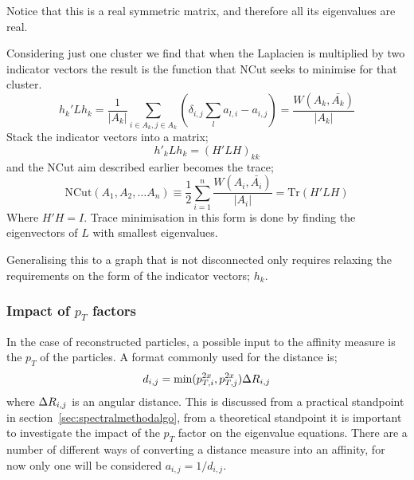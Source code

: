 Notice that this is a real symmetric matrix,
and therefore all its eigenvalues are real.

Considering just one cluster we find that when the Laplacien is multiplied by two indicator vectors
the result is the function that NCut seeks to minimise for that cluster.
\begin{equation}
    h_k'Lh_k = \frac{1}{|A_k|}\sum_{i \in A_k, j \in A_k} \left(\delta_{i, j}\sum_{l} a_{l, i} - a_{i, j} \right) = \frac{W(A_k, \bar{A_k})}{|A_k|}
\end{equation}
Stack the indicator vectors into a matrix;
\begin{equation} h'_k L h_k = (H'L H)_{kk}\end{equation}
and the NCut aim described earlier becomes the trace;
\begin{equation} \text{NCut}(A_1,A_2, \dots A_n) \equiv \frac{1}{2} \sum_{i=1}^n \frac{W(A_i, \bar{A_i})}{|A_i|} = \text{Tr}(H'LH)\end{equation}
Where \(H'H = I\).
Trace minimisation in this form is done
by finding the eigenvectors of \(L\) with smallest 
eigenvalues.

Generalising this to a graph that is not disconnected
only requires relaxing the requirements on the form of the indicator vectors; \(h_k\).

\subsubsection{Impact of \(p_T\) factors}
In the case of reconstructed particles, a possible input to the affinity measure is the \(p_T\) of the particles.
A format commonly used for the distance is;
\begin{equation}d_{i,j} = \text{min}(p_{T,i}^{2x}, p_{T,j}^{2x}) \Delta R{}_{i,j}\end{equation}
where \(\Delta R{}_{i,j}\) is an angular distance.
This is discussed from a practical standpoint in section~\ref{sec:spectralmethodalgo},
from a theoretical standpoint it is important to investigate the impact of the \(p_T\) factor on the eigenvalue equations.
There are a number of different ways of converting a distance measure into an affinity,
for now only one will be considered \(a_{i,j} = 1/d_{i,j}\).

